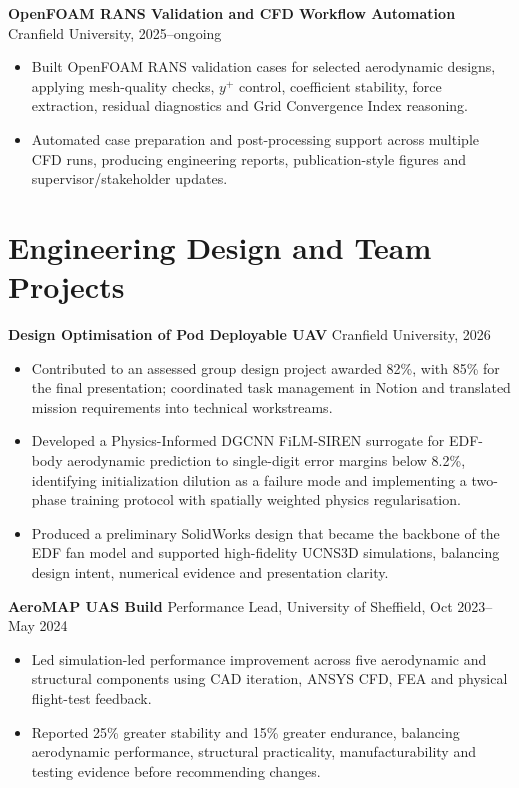 \documentclass[10pt,a4paper]{article}
\begin{document}
\textbf{OpenFOAM RANS Validation and CFD Workflow Automation} \hfill Cranfield University, 2025--ongoing
\begin{itemize}
  \item Built OpenFOAM RANS validation cases for selected aerodynamic designs, applying mesh-quality checks, $y^+$ control, coefficient stability, force extraction, residual diagnostics and Grid Convergence Index reasoning.
  \item Automated case preparation and post-processing support across multiple CFD runs, producing engineering reports, publication-style figures and supervisor/stakeholder updates.
\end{itemize}

\newpage

\section{Engineering Design and Team Projects}
\textbf{Design Optimisation of Pod Deployable UAV} \hfill Cranfield University, 2026
\begin{itemize}
  \item Contributed to an assessed group design project awarded 82\%, with 85\% for the final presentation; coordinated task management in Notion and translated mission requirements into technical workstreams.
  \item Developed a Physics-Informed DGCNN FiLM-SIREN surrogate for EDF-body aerodynamic prediction to single-digit error margins below 8.2\%, identifying initialization dilution as a failure mode and implementing a two-phase training protocol with spatially weighted physics regularisation.
  \item Produced a preliminary SolidWorks design that became the backbone of the EDF fan model and supported high-fidelity UCNS3D simulations, balancing design intent, numerical evidence and presentation clarity.
\end{itemize}

\textbf{AeroMAP UAS Build} \hfill Performance Lead, University of Sheffield, Oct 2023--May 2024
\begin{itemize}
  \item Led simulation-led performance improvement across five aerodynamic and structural components using CAD iteration, ANSYS CFD, FEA and physical flight-test feedback.
  \item Reported 25\% greater stability and 15\% greater endurance, balancing aerodynamic performance, structural practicality, manufacturability and testing evidence before recommending changes.
\end{itemize}
\end{document}
